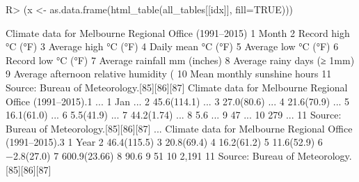 \documentclass[nojss]{jss}
\begin{document}
\begin{Schunk}
\begin{Sinput}
R> (x <- as.data.frame(html_table(all_tables[[idx]], fill=TRUE)))
\end{Sinput}
\end{Schunk}

\begin{Schunk}
\begin{Soutput}
   Climate data for Melbourne Regional Office (1991–2015)
1                                                   Month
2                                     Record high °C (°F)
3                                    Average high °C (°F)
4                                      Daily mean °C (°F)
5                                     Average low °C (°F)
6                                      Record low °C (°F)
7                            Average rainfall mm (inches)
8                              Average rainy days (≥ 1mm)
9                 Average afternoon relative humidity (%)
10                            Mean monthly sunshine hours
11             Source: Bureau of Meteorology.[85][86][87]
   Climate data for Melbourne Regional Office (1991–2015).1 ...
1                                                       Jan ...
2                                               45.6(114.1) ...
3                                                27.0(80.6) ...
4                                                21.6(70.9) ...
5                                                16.1(61.0) ...
6                                                 5.5(41.9) ...
7                                                44.2(1.74) ...
8                                                       5.6 ...
9                                                        47 ...
10                                                      279 ...
11               Source: Bureau of Meteorology.[85][86][87] ...
   Climate data for Melbourne Regional Office (1991–2015).3
1                                                      Year
2                                               46.4(115.5)
3                                                20.8(69.4)
4                                                16.2(61.2)
5                                                11.6(52.9)
6                                                −2.8(27.0)
7                                              600.9(23.66)
8                                                      90.6
9                                                        51
10                                                    2,191
11               Source: Bureau of Meteorology.[85][86][87]
\end{Soutput}
\end{Schunk}
\end{document}
